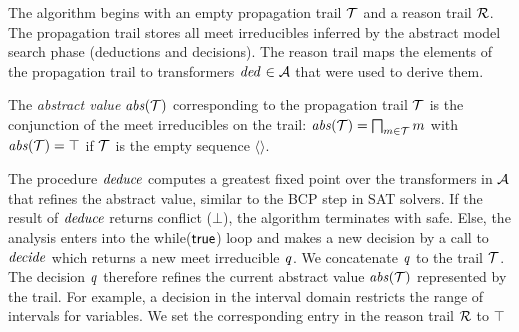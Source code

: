 The algorithm begins with an empty propagation trail $\mathcal{T}$ and 
a reason trail $\mathcal{R}$.
The propagation trail stores all meet irreducibles inferred by 
the abstract model search phase (deductions and decisions).  
The reason trail maps the elements of the propagation trail to 
transformers $\mathit{ded}^{}\in\mathcal{A}$ that were used to
derive them. 
%
\begin{definition} 
The \emph{abstract value} $\mathit{abs}(\mathcal{T})$ corresponding to 
the propagation trail $\mathcal{T}$ is the conjunction of the 
meet irreducibles on the trail:
$\mathit{abs}(\mathcal{T})=\bigsqcap_{m \in \mathcal{T}}m$ with
$\mathit{abs}(\mathcal{T})=\top$ if $\mathcal{T}$ is the empty sequence $\langle\rangle$.
\end{definition}
%
%
The procedure $\mathit{deduce}$ computes a greatest fixed point over the
transformers in $\mathcal{A}$ that refines the abstract value,
similar to the BCP step in SAT solvers.  If the result of $\mathit{deduce}$
returns \textsf{conflict} ($\bot$), the algorithm terminates with
\textsf{safe}.  Else, the analysis enters into the while($\mathsf{true}$) loop
and makes a new decision by a call to $\mathit{decide}$ which returns a new
meet irreducible $\mathit{q}$.
%
%
We concatenate $\mathit{q}$ to the
trail $\mathcal{T}$.  The decision $\mathit{q}$ therefore refines  the current abstract value $\mathit{abs}(\mathcal{T})$ represented by the trail. 
%
For example, a decision in the interval domain restricts the range of 
intervals for variables.
%
We set the corresponding entry in the reason trail $\mathcal{R}$ to $\top$

